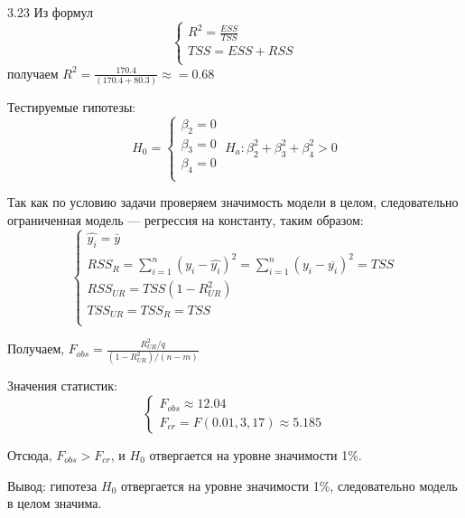 \begin{solution}{{3.23}}
Из формул
\[
\begin{cases}
R^2=\frac{ESS}{TSS}\\
TSS=ESS+RSS\\
\end{cases}
\]
получаем $R^2=\frac{170.4}{(170.4+80.3)}\approx=0.68$

Тестируемые гипотезы:
\[
H_0=
\begin{cases}
\beta_2=0\\
\beta_3=0\\
\beta_4=0\\
\end{cases}
\;
H_a:\beta_2^2+\beta_3^2+\beta_4^2>0
\]

Так как по условию задачи проверяем значимость модели в целом, следовательно ограниченная модель — регрессия на константу, таким образом:
\[
\begin{cases}
\widehat{y_i}=\bar{y}\\
RSS_{R}=\sum_{i=1}^{n}(y_i-\widehat{y_i})^2=\sum_{i=1}^{n}(y_i-\overline{y_i})^2=TSS\\
RSS_{UR}=TSS(1-R^2_{UR})\\
TSS_{UR}=TSS_{R}=TSS\\
\end{cases}
\]

Получаем, $F_{obs}=\frac{R_{UR}^2/q}{(1-R^2_{UR})/(n-m)}$

Значения статистик:
\[
\begin{cases}
F_{obs}\approx 12.04\\
F_{cr}=F(0.01,3,17)\approx 5.185
\end{cases}
\]

Отсюда,
$F_{obs}>F_{cr}$, и  $H_0$ отвергается на уровне значимости 1\%.

Вывод: гипотеза $H_0$ отвергается на уровне значимости 1\%,
следовательно модель в целом значима.
\end{solution}
\protect \hypertarget {soln:3.24}{}
